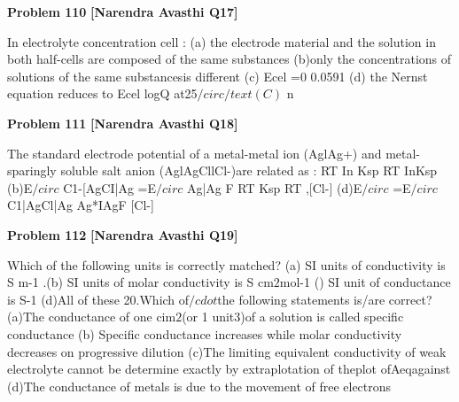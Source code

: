 \begin{problembox}
\textbf{Problem 110} \hfill \textbf{[Narendra Avasthi Q17]}
\label{q:ext-narendra_avasthi_all_questions-110}

In electrolyte concentration cell :
(a) the electrode material and the solution in both half-cells are composed of the same
substances
(b)only the concentrations of solutions of the same substancesis different
(c) Ecel =0
0.0591
(d) the Nernst equation reduces to Ecel
logQ at25$/circ/text(C)$
n
\end{problembox}

\begin{problembox}
\textbf{Problem 111} \hfill \textbf{[Narendra Avasthi Q18]}
\label{q:ext-narendra_avasthi_all_questions-111}

The standard electrode potential of a metal-metal ion (AglAg+) and metal-sparingly soluble
salt anion (AglAgCllCl-)are related as :
RT In Ksp
RT
InKsp
(b)E$/circ$
C1-[AgCI|Ag
=E$/circ$
Ag|Ag
F
RT
Ksp
RT ,[Cl-]
(d)E$/circ$
=E$/circ$
C1|AgCl|Ag
Ag*IAgF
[Cl-]
\end{problembox}

\begin{problembox}
\textbf{Problem 112} \hfill \textbf{[Narendra Avasthi Q19]}
\label{q:ext-narendra_avasthi_all_questions-112}

Which of the following units is correctly matched?
(a) SI units of conductivity is S m-1
.(b) SI units of molar conductivity is S cm$2$mol-1
() SI unit of conductance is S-1
(d)All of these
20.Which of$/cdot$the following statements is/are correct?
(a)The conductance of one cim$2$(or 1 unit3)of a solution is called specific conductance
(b) Specific conductance increases while molar conductivity decreases on progressive
dilution
(c)The limiting equivalent conductivity of weak electrolyte cannot be determine exactly by
extraplotation of theplot ofAeqagainst
(d)The conductance of metals is due to the movement of free electrons
\end{problembox}

